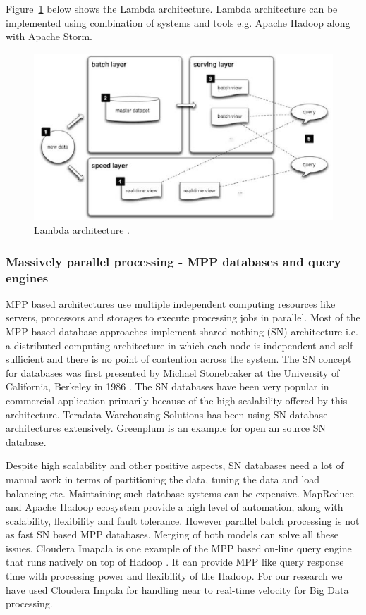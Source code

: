 Figure~\ref{fig:lambda} below shows the Lambda architecture. Lambda architecture can be implemented using combination of systems and tools e.g. Apache Hadoop along with Apache Storm.
\begin{figure}[ht]
  \begin{center}
    \includegraphics[width=\textwidth]{images/lambda.pdf}
    \caption{Lambda architecture \cite{lambdaarch}.}
    \label{fig:lambda}
  \end{center}
\end{figure}

\subsubsection{Massively parallel processing - MPP databases and query engines}\label{mpp}
MPP based architectures use multiple independent computing resources like servers, processors and storages to execute processing jobs in parallel. Most of the MPP based database approaches implement shared nothing (SN) architecture i.e. a distributed computing architecture in which each node is independent and self sufficient and there is no point of contention across the system. The SN concept for databases was first presented by Michael Stonebraker at the University of California, Berkeley in 1986 \cite{stonebraker1986case}. The SN databases have been very popular in commercial application primarily because of the high scalability offered by this architecture. Teradata Warehousing Solutions has been using SN database architectures extensively. Greenplum is an example for open an source SN database.

Despite high scalability and other positive aspects, SN databases need a lot of manual work in terms of partitioning the data, tuning the data and load balancing etc. Maintaining such database systems can be expensive. MapReduce and Apache Hadoop ecosystem provide a high level of automation, along with scalability, flexibility and fault tolerance. However parallel batch processing is not as fast SN based MPP databases. Merging of both models can solve all these issues. Cloudera Imapala is one example of the MPP based on-line query engine that runs natively on top of Hadoop \cite{ clouderaimpala}. It can provide MPP like query response time with processing power and flexibility of the Hadoop. For our research we have used Cloudera Impala for handling near to real-time velocity for Big Data processing.

